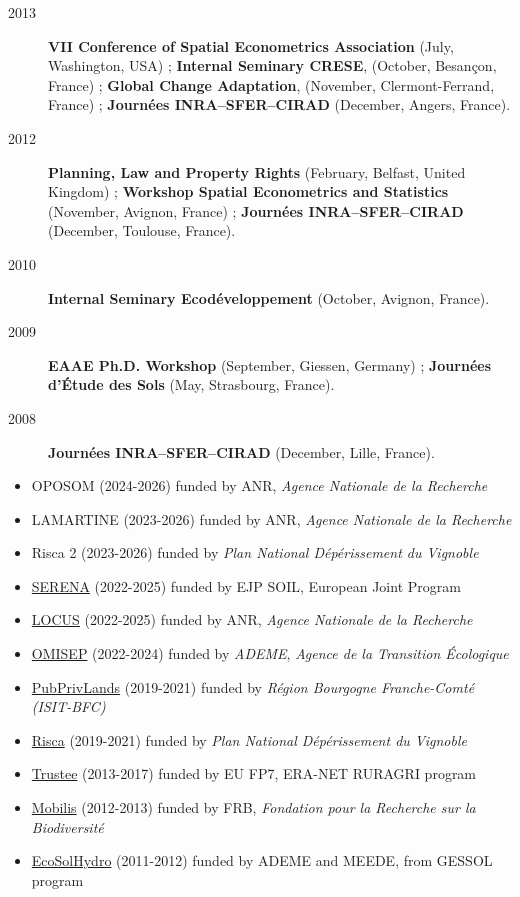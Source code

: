 \documentclass[11pt, a4paper]{./style}
\begin{document}
\begin{description}
\item[{2013}] \textbf{VII Conference of Spatial Econometrics Association}
(July, Washington, USA) ; \textbf{Internal Seminary CRESE}, (October,
Besançon, France) ; \textbf{Global Change Adaptation}, (November,
Clermont-Ferrand, France) ; \textbf{Journées INRA--SFER--CIRAD}
(December, Angers, France).
\item[{2012}] \textbf{Planning, Law and Property Rights} (February, Belfast,
United Kingdom) ; \textbf{Workshop Spatial Econometrics and Statistics}
(November, Avignon, France) ; \textbf{Journées INRA--SFER--CIRAD}
(December, Toulouse, France).
\item[{2010}] \textbf{Internal Seminary Ecodéveloppement} (October, Avignon,
France).
\item[{2009}] \textbf{EAAE Ph.D. Workshop} (September, Giessen, Germany) ;
\textbf{Journées d'Étude des Sols} (May, Strasbourg, France).
\item[{2008}] \textbf{Journées INRA--SFER--CIRAD} (December, Lille, France).
\end{description}

\label{sec:orge4bc3f1}
\label{sec:org38671ed}

\begin{itemize}
\item OPOSOM (2024-2026) funded by ANR, \emph{Agence Nationale de la
Recherche}
\item LAMARTINE (2023-2026) funded by ANR, \emph{Agence Nationale de la
Recherche}
\item Risca 2 (2023-2026) funded by \emph{Plan National Dépérissement du
Vignoble}
\item \href{https://ejpsoil.eu/soil-research/serena}{SERENA} (2022-2025) funded by EJP SOIL, European Joint Program
\item \href{https://anr.fr/Project-ANR-21-CE03-0007}{LOCUS} (2022-2025) funded by ANR, \emph{Agence Nationale de la
Recherche}
\item \href{https://www.ademe.fr/en/frontpage/}{OMISEP} (2022-2024) funded by \emph{ADEME}, \emph{Agence de la Transition
Écologique}
\item \href{http://www.ubfc.fr/pubprivlands/}{PubPrivLands} (2019-2021) funded by \emph{Région Bourgogne
Franche-Comté (ISIT-BFC)}
\item \href{https://www.plan-deperissement-vigne.fr/travaux-de-recherche/programmes-de-recherche/risca}{Risca} (2019-2021) funded by \emph{Plan National Dépérissement du
Vignoble}
\item \href{https://www.trustee-project.eu/}{Trustee} (2013-2017) funded by EU FP7, ERA-NET RURAGRI program
\item \href{https://www.fondationbiodiversite.fr/en/}{Mobilis} (2012-2013) funded by FRB, \emph{Fondation pour la Recherche
sur la Biodiversité}
\item \href{http://www.gessol.fr/content/integrer-la-valeur-epuratrice-de-sols-hydromorphes-dans-leur-usage-quelles-strategies-d-inte}{EcoSolHydro} (2011-2012) funded by ADEME and MEEDE, from GESSOL
program
\end{itemize}
\end{document}
